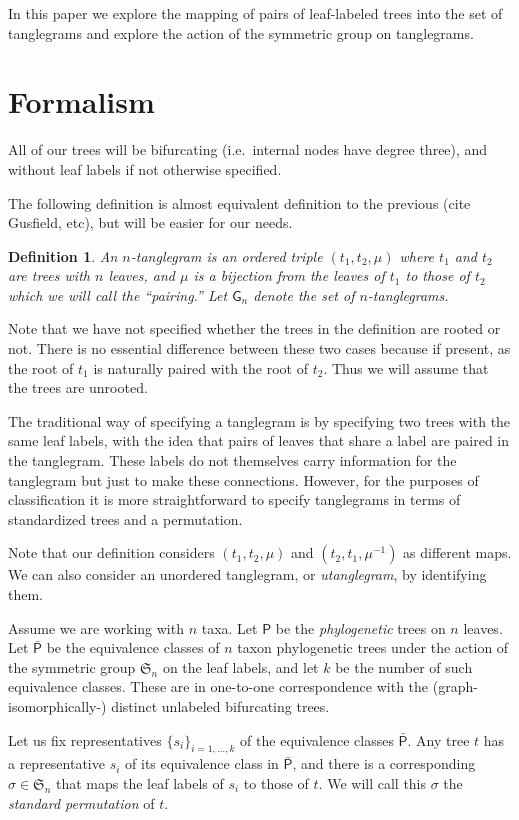 \documentclass{amsart}
\newtheorem{definition}[theorem]{Definition}
\newcommand{\fS}{\mathfrak S}
\newcommand{\pairing}{\mu}
\newcommand{\tangle}{\mathsf{G}}
\newcommand{\ptree}{\mathsf{P}}
\newcommand{\ptequiv}{\bar{\ptree}}  %
\begin{document}
In this paper we explore the mapping of pairs of leaf-labeled trees into the set of tanglegrams and explore the action of the symmetric group on tanglegrams.


\section{Formalism}
All of our trees will be bifurcating (i.e.\ internal nodes have degree three), and without leaf labels if not otherwise specified.

The following definition is almost equivalent definition to the previous (cite Gusfield, etc), but will be easier for our needs.
\begin{definition}
An $n$-\textit{tanglegram} is an ordered triple $(t_1, t_2, \pairing)$ where $t_1$ and $t_2$ are trees with $n$ leaves, and $\pairing$ is a bijection from the leaves of $t_1$ to those of $t_2$ which we will call the ``pairing.''
Let $\tangle_n$ denote the set of $n$-tanglegrams.
\end{definition}
Note that we have not specified whether the trees in the definition are rooted or not.
There is no essential difference between these two cases because if present, as the root of $t_1$ is naturally paired with the root of $t_2$.
Thus we will assume that the trees are unrooted.

The traditional way of specifying a tanglegram is by specifying two trees with the same leaf labels, with the idea that pairs of leaves that share a label are paired in the tanglegram.
These labels do not themselves carry information for the tanglegram but just to make these connections.
However, for the purposes of classification it is more straightforward to specify tanglegrams in terms of standardized trees and a permutation.

Note that our definition considers $(t_1, t_2, \pairing)$ and $(t_2, t_1, \pairing^{-1})$ as different maps.
We can also consider an unordered tanglegram, or \textit{utanglegram}, by identifying them.

Assume we are working with $n$ taxa.
Let $\ptree$ be the \emph{phylogenetic} trees on $n$ leaves.
Let $\ptequiv$ be the equivalence classes of $n$ taxon phylogenetic trees under the action of the symmetric group $\fS_n$ on the leaf labels, and let $k$ be the number of such equivalence classes.
These are in one-to-one correspondence with the (graph-isomorphically-) distinct unlabeled bifurcating trees.

Let us fix representatives $\{s_i\}_{i=1,\ldots,k}$ of the equivalence classes $\ptequiv$.
Any tree $t$ has a representative $s_i$ of its equivalence class in $\ptequiv$, and there is a corresponding $\sigma \in \fS_n$ that maps the leaf labels of $s_i$ to those of $t$.
We will call this $\sigma$ the \emph{standard permutation} of $t$.
\end{document}
